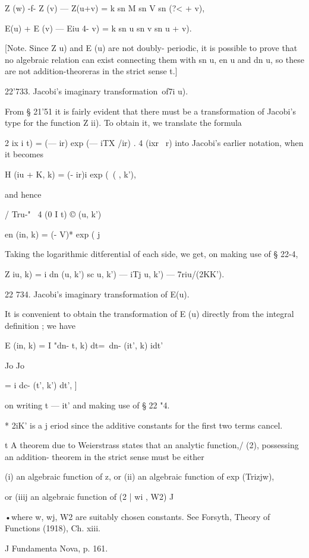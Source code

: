 Z (w) -f- Z (v) — Z(u+v) = k sn M sn V sn (?< + v),

E(u) + E (v) — Eiu 4- v) = k sn u sn v sn u + v).

[Note. Since Z u) and E (u) are not doubly- periodic, it is possible
to prove that no algebraic relation can exist connecting them with sn
u, en u and dn u, so these are not addition-theoreras in the strict
sense t.]

22'733. Jacobi's imaginary transformation\ of7i u).

From § 21'51 it is fairly evident that there must be a transformation
of Jacobi's type for the function Z ii). To obtain it, we translate
the formula

 2 ix i t) = (— ir) exp (— iTX /ir) . 4 (ixr \ r) into Jacobi's
earlier notation, when it becomes

H (iu + K, k) = (- ir)i exp (\ ( , k'),

and hence

/ Tru-" \ 4 (0 I t) © (u, k')

en (in, k) = (- V)* exp ( j

Taking the logarithmic ditferential of each side, we get, on making
use of § 22-4,

Z iu, k) = i dn (u, k') sc u, k') — iTj u, k') — 7riu/(2KK').

22 734. Jacobi's imaginary transformation of E(u).

It is convenient to obtain the transformation of E (u) directly from
the integral definition ; we have

E (in, k) = I "dn- t, k) dt=\ dn- (it', k) idt'

Jo Jo

= i dc- (t', k') dt', ]

on writing t — it' and making use of § 22 "4.

* 2iK' is a j eriod since the additive constants for the first two
terms cancel.

t A theorem due to Weierstrass states that an analytic function,/ (2),
possessing an addition- theorem in the strict sense must be either

(i) an algebraic function of z, or (ii) an algebraic function of exp
(Trizjw),

or (iiij an algebraic function of (2 | wi , W2) J

•where w, wj, W2 are suitably chosen constants. See Forsyth, Theory of
Functions (1918), Ch. xiii.

J Fundamenta Nova, p. 161.

